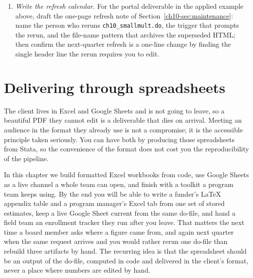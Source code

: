 \documentclass[
    a4paper,
    fontsize=10pt,
    twoside=true,
    numbers=noenddot,
]{kaobook}
\begin{document}
\begin{enumerate}
\item \emph{Write the refresh calendar.} For the portal deliverable in the applied example above, draft the one-page refresh note of Section~\ref{ch10-sec:maintenance}: name the person who reruns \texttt{ch10\_smallmult.do}, the trigger that prompts the rerun, and the file-name pattern that archives the superseded HTML; then confirm the next-quarter refresh is a one-line change by finding the single header line the rerun requires you to edit.
\end{enumerate}
\chapter{Delivering through spreadsheets}\label{ch:sheets}

The client lives in Excel and Google Sheets and is not going to leave, so a beautiful PDF they cannot edit is a deliverable that dies on arrival. Meeting an audience in the format they already use is not a compromise; it is the accessible principle taken seriously. You can have both by producing those spreadsheets from Stata, so the convenience of the format does not cost you the reproducibility of the pipeline.

In this chapter we build formatted Excel workbooks from code, use Google Sheets as a live channel a whole team can open, and finish with a toolkit a program team keeps using. By the end you will be able to write a funder's \LaTeX{} appendix table and a program manager's Excel tab from one set of stored estimates, keep a live Google Sheet current from the same do-file, and hand a field team an enrollment tracker they run after you leave. That matters the next time a board member asks where a figure came from, and again next quarter when the same request arrives and you would rather rerun one do-file than rebuild three artifacts by hand. The recurring idea is that the spreadsheet should be an output of the do-file, computed in code and delivered in the client's format, never a place where numbers are edited by hand.
\end{document}

